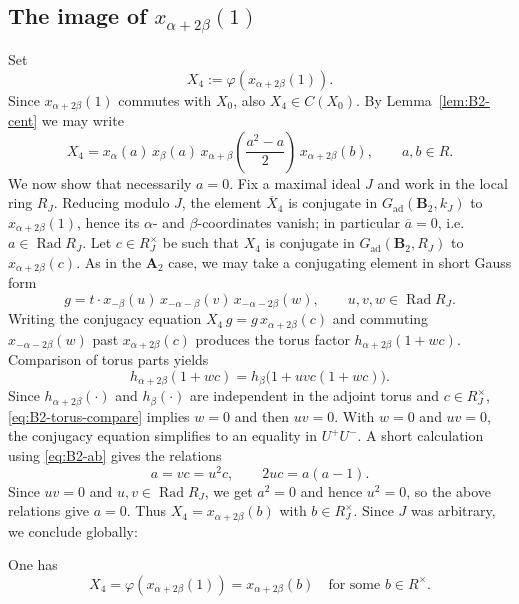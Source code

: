 \documentclass[]{jgcc}
\DeclareMathOperator{\Rad}{Rad}
\numberwithin{equation}{section}
\begin{document}
\subsection{\texorpdfstring{The image of $x_{\alpha+2\beta}(1)$}{The image of xalpha+2beta(1)}}

Set
\[
X_4:=\varphi(x_{\alpha+2\beta}(1)).
\]
Since $x_{\alpha+2\beta}(1)$ commutes with $X_0$, also $X_4\in C(X_0)$.
By Lemma~\ref{lem:B2-cent} we may write
\begin{equation}\label{eq:B2-X4-general}
X_4=
x_\alpha(a)\,x_\beta(a)\,x_{\alpha+\beta}\!\left(\frac{a^2-a}{2}\right)\,x_{\alpha+2\beta}(b),
\qquad a,b\in R.
\end{equation}
We now show that necessarily $a=0$.
Fix a maximal ideal $J$ and work in the local ring $R_J$.
Reducing modulo $J$, the element $\overline X_4$ is conjugate in $G_{\mathrm{ad}}(\mathbf B_2,k_J)$
to $x_{\alpha+2\beta}(1)$, hence its $\alpha$- and $\beta$-coordinates vanish; in particular
$\overline a=0$, i.e. $a\in\Rad R_J$.
Let $c\in R_J^\times$ be such that $X_4$ is conjugate in $G_{\mathrm{ad}}(\mathbf B_2,R_J)$ to $x_{\alpha+2\beta}(c)$.
As in the $\mathbf A_2$ case, we may take a conjugating element in short Gauss form
\[
g=t\cdot x_{-\beta}(u)\,x_{-\alpha-\beta}(v)\,x_{-\alpha-2\beta}(w),
\qquad u,v,w\in\Rad R_J.
\]
Writing the conjugacy equation $X_4\,g=g\,x_{\alpha+2\beta}(c)$ and commuting
$x_{-\alpha-2\beta}(w)$ past $x_{\alpha+2\beta}(c)$ produces the torus factor
$h_{\alpha+2\beta}(1+wc)$.
Comparison of torus parts yields
\begin{equation}\label{eq:B2-torus-compare}
h_{\alpha+2\beta}(1+wc)=h_{\beta}\bigl(1+uvc(1+wc)\bigr).
\end{equation}
Since $h_{\alpha+2\beta}(\cdot)$ and $h_\beta(\cdot)$ are independent in the adjoint torus and $c\in R_J^\times$,
\eqref{eq:B2-torus-compare} implies $w=0$ and then $uv=0$.
With $w=0$ and $uv=0$, the conjugacy equation simplifies to an equality in $U^+U^-$.
A short calculation using \eqref{eq:B2-ab} gives the relations
\[
a=vc=u^2c,\qquad 2uc=a(a-1).
\]
Since $uv=0$ and $u,v\in\Rad R_J$, we get $a^2=0$ and hence $u^2=0$, so the above relations give $a=0$.
Thus $X_4=x_{\alpha+2\beta}(b)$ with $b\in R_J^\times$.
Since $J$ was arbitrary, we conclude globally:

\begin{lem}\label{lem:B2-X4}
One has
\[
X_4=\varphi(x_{\alpha+2\beta}(1))=x_{\alpha+2\beta}(b)
\quad\text{for some }b\in R^\times.
\]
\end{lem}
\end{document}
